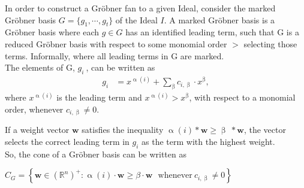 In order to construct a Gröbner fan to a given Ideal, consider the marked Gröbner basis $G = \lbrace g_{1},\cdots,g_{t}\rbrace $ of the Ideal $I$.
A marked Gröbner basis is a Gröbner basis where each $g \in G$ has an identified leading term, such that G is a reduced Gröbner basis with respect to some monomial order $>$ selecting those terms.
Informally, where all leading terms in G are marked.\\
\newline
The elements of G, $g_{i}~$, can be written as
\begin{align*}
 g_{i} &  = x^{\upalpha\left( i\right) } +  \sum_{\upbeta} c_{i,\upbeta} \cdot x^{\upbeta}, 
\end{align*}
where $ x^{\upalpha\left( i\right) }$ is the leading term and $ x^{\upalpha\left( i\right) } > x^{\upbeta} $, with respect to a monomial order, whenever $c_{i,\upbeta} \neq 0 $.

If a weight vector $\textbf{w}$ satisfies the inequality
$\upalpha\left( i\right) \ast \textbf{w} \geq \upbeta~\ast\textbf{w}$, the vector selects the correct leading term in $g_{i}$ as the term with the highest weight.\\

So, the cone of a Gröbner basis can be written as \cite{coxOshea}\\
\begin{center}
$C_{G} = \left\lbrace \textbf{w} \in \left(\mathbb{R}^{n}\right)^{+} : \upalpha\left( i\right) \cdot \textbf{w} \geq \beta \cdot \textbf{w}~~~ \textrm{whenever}~ c_{i,\upbeta} \neq 0 \right\rbrace   $
\end{center}


